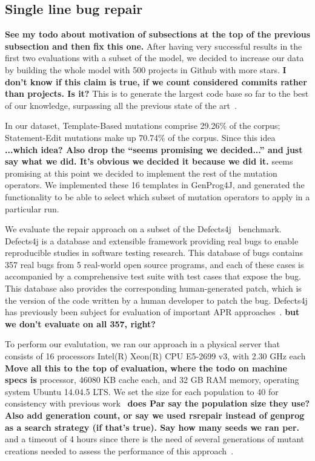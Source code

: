 \documentclass[conference]{IEEEtran}
\newcommand{\todo}[1]
  {{\scriptsize \textbf{\color{red} {#1}}}}
\begin{document}
{\subsection{Single line bug repair}
\label{sec:single}

\todo{See my todo about motivation of subsections at the top of the previous
  subsection and then fix this one.}
After having very successful results in the first two evaluations with a subset of the model, we decided 
to increase our data by building the whole model with 500 projects in Github with more 
stars.\todo{I don't know if this claim is true, if we count considered commits
  rather than projects.  Is it?} This is to generate the largest code base so far to the best 
of our knowledge, surpassing all the previous state of the 
art~\cite{long15,Soto15,zhong15,matias15,xuan16}. 

In our dataset, Template-Based mutations comprise 29.26\% of the corpus; Statement-Edit mutations make up 70.74\% of the 
corpus. Since this idea\todo{...which idea? Also drop the ``seems promising we
  decided...'' and just say what we did.  It's obvious we decided it because we
  did it.} seems promising at this point we decided to implement the rest 
of the mutation operators. We implemented these 16 templates in GenProg4J, and generated the functionality 
to be able to select which subset of mutation operators to apply in a particular 
run.

We evaluate the repair approach on a subset of the Defects4j~\cite{just14}
benchmark.  Defects4j is a database and extensible 
framework providing real bugs to enable reproducible studies in software testing 
research. This database of bugs contains 357 real bugs from 5 
real-world open source programs, and each of these cases is accompanied by a 
comprehensive test suite with test cases that expose the bug. This database also provides 
the corresponding human-generated patch, which is the version of the code written by a human 
developer to patch the bug. Defects4j has previously been 
subject for evaluation of important APR approaches~\cite{Durieux15}.\todo{but we
  don't evaluate on all 357, right?}

To perform our evalutation, we ran our approach in a physical server that 
consists of 16 processors Intel(R) Xeon(R) CPU E5-2699 v3, with 2.30 GHz each
\todo{Move all this to the top of evaluation, where the todo on machine specs is}
processor, 46080 KB cache each, and 32 GB RAM memory, operating system Ubuntu 
14.04.5 LTS. We set the size for each population to 40 for consistency with 
previous work~\cite{legoues12,kim2013}\todo{does Par say the population size
  they use? Also add generation count, or say we used rsrepair instead of
  genprog as a search strategy (if that's true).  Say how many seeds we ran per.}  and a timeout of 4 hours since there is 
the need of several generations of mutant creations needed to assess the 
performance of this approach~\cite{arcuri11}.

}
\end{document}
